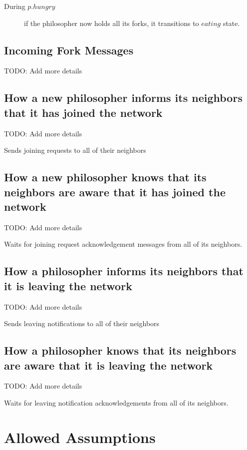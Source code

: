 \documentclass[11pt]{article}
\begin{document}
\begin{description}
\item[During $p.hungry$] if the philosopher now holds all its forks, it transitions to $eating$ state.
\end{description}
\subsection{Incoming Fork Messages}
TODO: Add more details


\subsection{How a new philosopher informs its neighbors that it has joined the network}
TODO: Add more details

Sends joining requests to all of their neighbors

\subsection{How a new philosopher knows that its neighbors are aware that it has joined the network}
TODO: Add more details

Waits for joining request acknowledgement messages from all of its neighbors.
\subsection{How a philosopher informs its neighbors that it is leaving the network}
TODO: Add more details

Sends leaving notifications to all of their neighbors

\subsection{How a philosopher knows that its neighbors are aware that it is leaving the network}
TODO: Add more details

Waits for leaving notification acknowledgements from all of its neighbors.

\section{Allowed Assumptions}
\end{document}
